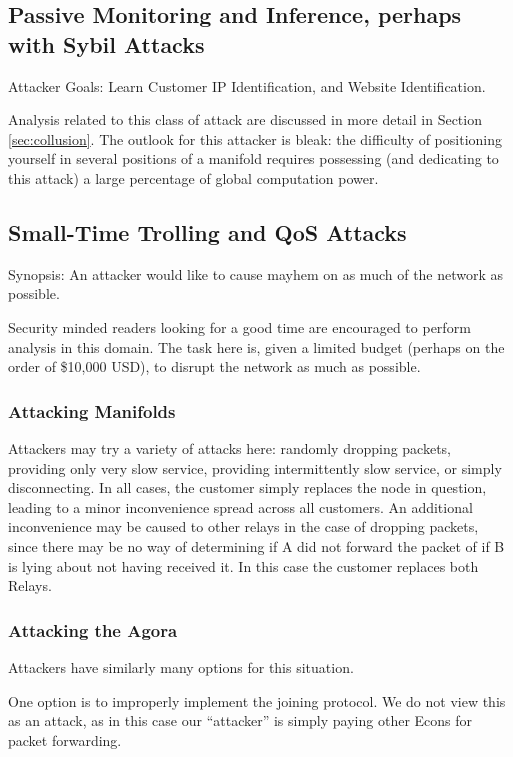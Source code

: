 \documentclass{article}
\begin{document}
\subsection{Passive Monitoring and Inference, perhaps with Sybil Attacks}

Attacker Goals: Learn Customer IP Identification, and Website Identification.

Analysis related to this class of attack are discussed in more detail
in Section \ref{sec:collusion}. The outlook for this attacker is
bleak: the difficulty of positioning yourself in several positions of
a manifold requires possessing (and dedicating to this attack) a large
percentage of global computation power.

\subsection{Small-Time Trolling and QoS Attacks}

Synopsis: An attacker would like to cause mayhem on as much of the network as possible.

Security minded readers looking for a good time are encouraged to
perform analysis in this domain. The task here is, given a limited
budget (perhaps on the order of \$10,000 USD), to disrupt the network
as much as possible.

\subsubsection{Attacking Manifolds}

Attackers may try a variety of attacks here: randomly dropping
packets, providing only very slow service, providing intermittently
slow service, or simply disconnecting. In all cases, the customer
simply replaces the node in question, leading to a minor inconvenience
spread across all customers. An additional inconvenience may be caused
to other relays in the case of dropping packets, since there may be no
way of determining if A did not forward the packet of if B is lying
about not having received it. In this case the customer replaces both
Relays.

\subsubsection{Attacking the Agora}

Attackers have similarly many options for this situation.

One option is to improperly implement the joining protocol. We do not
view this as an attack, as in this case our ``attacker'' is simply
paying other Econs for packet forwarding.
\end{document}
